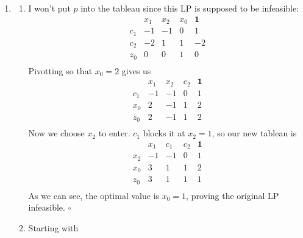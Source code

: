 \documentclass[12pt]{article}
\begin{document}
\begin{enumerate}
      \item \begin{enumerate}
                  \item I won't put $p$ into the tableau since this LP is supposed to be infeasible:
                        \[\begin{array}{c|rrr|l}
                                        & x_1 & x_2 & x_0 & \mathbf{1} \\ \hline
                                    c_1 & -1  & -1  & 0   & 1          \\
                                    c_2 & -2  & 1   & 1   & -2         \\ \hline
                                    z_0 & 0   & 0   & 1   & 0          \\
                              \end{array}\]
                        Pivotting so that $x_0=2$ gives us
                        \[\begin{array}{c|rrr|l}
                                        & x_1 & x_2 & c_2 & \mathbf{1} \\ \hline
                                    c_1 & -1  & -1  & 0   & 1          \\
                                    x_0 & 2   & -1  & 1   & 2          \\ \hline
                                    z_0 & 2   & -1  & 1   & 2          \\
                              \end{array}\]
                        Now we choose $x_2$ to enter.
                        $c_1$ blocks it at $x_2=1$, so our new tableau is
                        \[\begin{array}{c|rrr|l}
                                        & x_1 & c_1 & c_2 & \mathbf{1} \\ \hline
                                    x_2 & -1  & -1  & 0   & 1          \\
                                    x_0 & 3   & 1   & 1   & 2          \\ \hline
                                    z_0 & 3   & 1   & 1   & 1          \\
                              \end{array}\]
                        As we can see, the optimal value is $x_0=1$, proving the original LP infeasible. $\square$
                  \item Starting with
                        \[\begin{array}{c|rrr|l}

\end{array}\]
\end{enumerate}
\end{enumerate}
\end{document}
